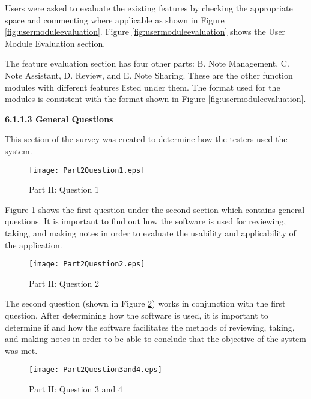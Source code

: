 Users were asked to evaluate the existing features by checking the appropriate space and commenting where applicable as shown in Figure \ref{fig:usermoduleevaluation}. Figure \ref{fig:usermoduleevaluation} shows the User Module Evaluation section.

The feature evaluation section has four other parts: B. Note Management, C. Note Assistant, D. Review, and E. Note Sharing. These are the other function modules with different features listed under them. The format used for the modules is consistent with the format shown in Figure \ref{fig:usermoduleevaluation}.

\begin{flushleft}
\textbf{6.1.1.3 General Questions}
\end{flushleft}

\begin{raggedright}
This section of the survey was created to determine how the testers used the system.
\end{raggedright}

\begin{figure}[htbp!]
   \centering
   \texttt{[image: Part2Question1.eps]} 
   \caption{Part II: Question 1}
   \label{fig:p2q1}
\end{figure}

\pagebreak

Figure \ref{fig:p2q1} shows the first question under the second section which contains general questions. It is important to find out how the software is used for reviewing, taking, and making notes in order to evaluate the usability and applicability of the application.

\begin{figure}[htbp!]
   \centering
   \texttt{[image: Part2Question2.eps]} 
   \caption{Part II: Question 2}
   \label{fig:p2q2}
\end{figure}

The second question (shown in Figure \ref{fig:p2q2}) works in conjunction with the first question. After determining how the software is used, it is important to determine if and how the software facilitates the methods of reviewing, taking, and making notes in order to be able to conclude that the objective of the system was met.

\begin{figure}[htbp!]
   \centering
   \texttt{[image: Part2Question3and4.eps]} 
   \caption{Part II: Question 3 and 4}
   \label{fig:p2q3n4}
\end{figure}

